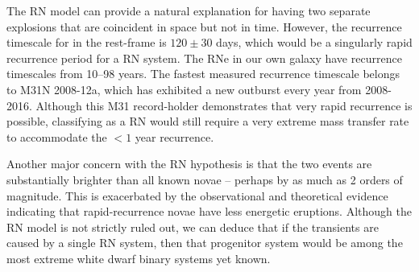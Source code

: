 The RN model can provide a natural explanation for having two separate
explosions that are coincident in space but not in time.  However, the
recurrence timescale for \spock in the rest-frame is $120\pm30$ days,
which would be a singularly rapid recurrence period for a RN system.
The RNe in our own galaxy have recurrence timescales from 10--98
years\cite{Schaefer:2010}.  The fastest measured recurrence timescale
belongs to M31N 2008-12a, which has exhibited a new outburst every
year from 2008-2016\cite{Tang:2014, Darnley:2014, Darnley:2015,
  Henze:2015, Henze:2015a, Darnley:2016}.  Although this M31
record-holder demonstrates that very rapid recurrence is possible,
classifying \spock as a RN would still require a very extreme mass
transfer rate to accommodate the $<1$ year recurrence.

Another major concern with the RN hypothesis is that the two \spock events
are substantially brighter than all known novae -- perhaps by as much
as 2 orders of magnitude.  This is exacerbated by the observational
and theoretical evidence indicating that rapid-recurrence novae have
less energetic eruptions\cite{Yaron:2005}.
Although the RN model
is not strictly ruled out, we can deduce that if the \spock transients
are caused by a single RN system, then that progenitor system would be
among the most extreme white dwarf binary systems yet known.




